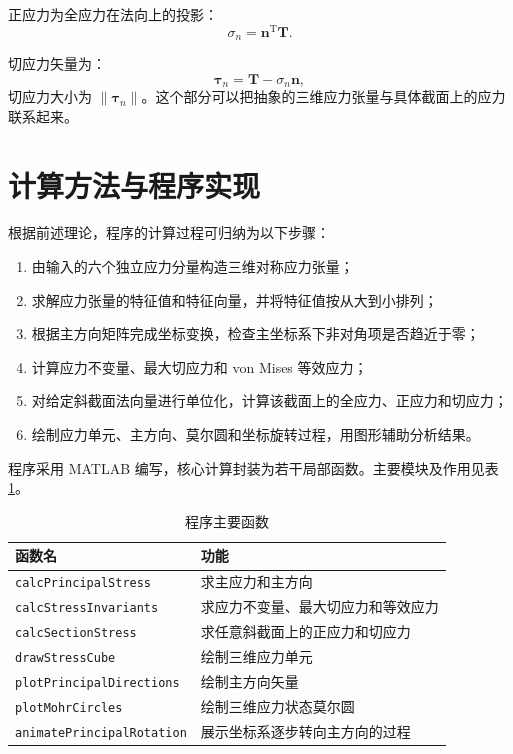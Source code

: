 \documentclass[UTF8,a4paper,12pt]{ctexart}
\newcommand{\vect}[1]{\bm{#1}}
\begin{document}
正应力为全应力在法向上的投影：
\begin{equation}
\sigma_n = \vect n^{\mathrm T}\vect T .
\end{equation}

切应力矢量为：
\begin{equation}
\vect \tau_n = \vect T-\sigma_n \vect n ,
\end{equation}
切应力大小为 $\lVert\vect\tau_n\rVert$。这个部分可以把抽象的三维应力张量与具体截面上的应力联系起来。

\section{计算方法与程序实现}

根据前述理论，程序的计算过程可归纳为以下步骤：
\begin{enumerate}[label=\arabic*.]
\item 由输入的六个独立应力分量构造三维对称应力张量；
\item 求解应力张量的特征值和特征向量，并将特征值按从大到小排列；
\item 根据主方向矩阵完成坐标变换，检查主坐标系下非对角项是否趋近于零；
\item 计算应力不变量、最大切应力和 von Mises 等效应力；
\item 对给定斜截面法向量进行单位化，计算该截面上的全应力、正应力和切应力；
\item 绘制应力单元、主方向、莫尔圆和坐标旋转过程，用图形辅助分析结果。
\end{enumerate}

程序采用 MATLAB 编写，核心计算封装为若干局部函数。主要模块及作用见表 \ref{tab:functions}。

\begin{table}[H]
\centering
\caption{程序主要函数}
\label{tab:functions}
\begin{tabular}{ll}
\toprule
函数名 & 功能 \\
\midrule
\verb|calcPrincipalStress| & 求主应力和主方向 \\
\verb|calcStressInvariants| & 求应力不变量、最大切应力和等效应力 \\
\verb|calcSectionStress| & 求任意斜截面上的正应力和切应力 \\
\verb|drawStressCube| & 绘制三维应力单元 \\
\verb|plotPrincipalDirections| & 绘制主方向矢量 \\
\verb|plotMohrCircles| & 绘制三维应力状态莫尔圆 \\
\verb|animatePrincipalRotation| & 展示坐标系逐步转向主方向的过程 \\
\bottomrule
\end{tabular}
\end{table}
\end{document}
